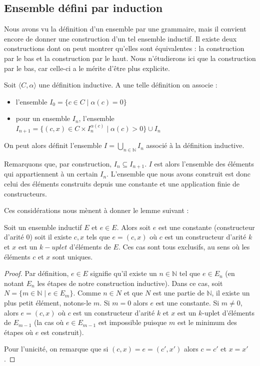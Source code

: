 \subsection{Ensemble défini par induction}

Nous avons vu la définition d'un ensemble par une grammaire, mais il convient encore de donner une construction d'un tel ensemble inductif. Il existe deux constructions dont on peut montrer qu'elles sont équivalentes : la construction \og par le bas\fg{} et la construction \og par le haut\fg{}. Nous n'étudierons ici que la construction par le bas, car celle-ci a le mérite d'être plus explicite.

\begin{defi}
    Soit $\langle C,\alpha\rangle$ une définition inductive. A une telle définition on associe : 
    \begin{itemize}[label=$\bullet$]
        \item l'ensemble $I_0 = \{c\in C\mid \alpha(c) = 0\}$
        \item pour un ensemble $I_n$, l'ensemble $I_{n+1}=\{ (c,x) \in C\times {I_n^{\alpha(c)}}\mid \alpha(c) > 0\}\cup I_n$
    \end{itemize}

    On peut alors définit l'ensemble $\displaystyle{I = \bigcup_{n\in \mathbb N}I_n}$ associé à la définition inductive.
\end{defi}

\begin{rmk}
    Remarquons que, par construction, $I_n\subseteq I_{n+1}$. $I$ est alors l'ensemble des éléments qui appartiennent à un certain $I_n$. L'ensemble que nous avons construit est donc celui des éléments construits depuis une constante et une application finie de constructeurs.
\end{rmk}

Ces considérations nous mènent à donner le lemme suivant :

\begin{lem}
    Soit un ensemble inductif $E$ et $e\in E$. Alors soit $e$ est une constante (constructeur d'arité $0$) soit il existe $c,x$ tels que $e = (c,x)$ où $c$ est un constructeur d'arité $k$ et $x$ est un $k-uplet$ d'éléments de $E$. Ces cas sont tous exclusifs, au sens où les éléments $c$ et $x$ sont uniques.
\end{lem}

\begin{proof}
    Par définition, $e\in E$ signifie qu'il existe un $n\in \mathbb N$ tel que $e\in E_n$ (en notant $E_n$ les étapes de notre construction inductive). Dans ce cas, soit $N = \{m \in \mathbb N \mid e \in E_m\}$. Comme $n\in N$ et que $N$ est une partie de $\mathbb N$, il existe un plus petit élément, notons-le $m$. Si $m = 0$ alors $e$ est une constante. Si $m\neq 0$, alors $e = (c,x)$ où $c$ est un constructeur d'arité $k$ et $x$ est un $k$-uplet d'éléments de $E_{m-1}$ (la cas où $e\in E_{m-1}$ est impossible puisque $m$ est le minimum des étapes où $e$ est construit).

    Pour l'unicité, on remarque que si $(c,x) = e = (c',x')$ alors $c = c'$ et $x = x'$.
\end{proof}

